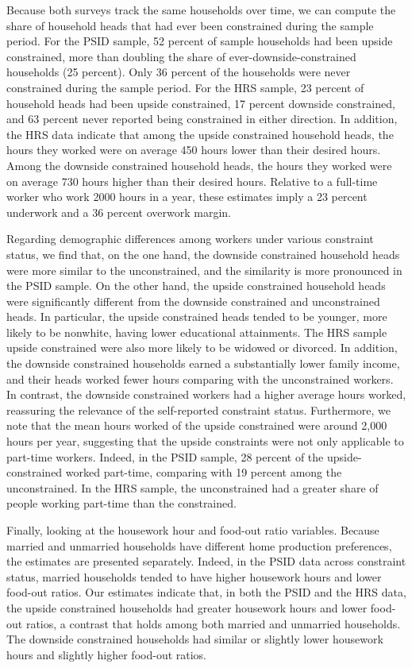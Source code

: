 Because both surveys track the same households over time, we can compute the share of household heads that had ever been constrained during the sample period. For the PSID sample, 52 percent of sample households had been upside constrained, more
than doubling the share of ever-downside-constrained households (25 percent). Only 36 percent of the households were never constrained during the sample period. For the HRS sample, 23 percent of household heads had been upside constrained, 17 percent downside constrained, and 63 percent never reported being constrained in either direction. In addition, the HRS data indicate that among the upside constrained household heads, the hours they worked were on average 450 hours lower than their desired hours.  Among the downside constrained household heads, the hours they worked were on average 730 hours higher than their desired hours. Relative to a full-time worker who work 2000 hours in a year, these estimates imply a 23 percent underwork and a 36 percent overwork margin.

Regarding demographic differences among workers under various constraint status, we find that, on the one hand, the downside constrained household heads were more similar to the unconstrained, and the similarity is more pronounced in the PSID sample. On the other hand, the upside constrained household heads were significantly different from the downside constrained and unconstrained heads. In particular, the upside constrained heads tended to be younger, more likely to be nonwhite, having lower educational attainments. The HRS sample upside constrained were also more likely to be widowed or divorced. In addition, the downside constrained households earned a substantially lower family income, and their heads worked fewer hours comparing with the unconstrained workers. In contrast, the downside constrained workers had a higher average hours worked, reassuring the relevance of the self-reported constraint status. Furthermore, we note that the mean hours worked of the upside constrained were around 2,000 hours per year, suggesting that the upside constraints were not only applicable to part-time workers. Indeed, in the PSID sample, 28 percent of the upside-constrained worked part-time, comparing with 19 percent among the unconstrained.  In the HRS sample, the unconstrained had a greater share of people working part-time than the constrained.

Finally, looking at the housework hour and food-out ratio variables. Because married and unmarried households have different home production preferences, the estimates are presented separately. Indeed, in the PSID data across constraint status, married households tended to have higher housework hours and lower food-out ratios. Our estimates indicate that, in both the PSID and the HRS data, the upside constrained households had greater housework hours and lower food-out ratios, a contrast that holds among both married and unmarried households. The downside constrained households had similar or slightly lower housework hours and slightly higher food-out ratios.

